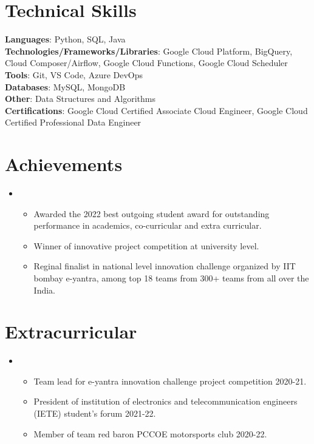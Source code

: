 \documentclass[letterpaper,11pt]{article}
\newcommand{\resumeItem}[1]{
  \item\small{
	{#1 \vspace{-2pt}}
  }
}
\newcommand{\resumeItemListStart}{\begin{itemize}}
\newcommand{\resumeItemListEnd}{\end{itemize}\vspace{-5pt}}
\begin{document}
\section{Technical Skills}
 \begin{itemize}[leftmargin=0.15in, label={}]
	\small{\item{
 	\textbf{Languages}{: Python, SQL, Java } \\
 	\textbf{Technologies/Frameworks/Libraries}{: Google Cloud Platform, BigQuery, Cloud Composer/Airflow, Google Cloud Functions, Google Cloud Scheduler } \\
 	\textbf{Tools}{: Git, VS Code, Azure DevOps } \\
 	\textbf{Databases}{: MySQL, MongoDB } \\
 	\textbf{Other}{: Data Structures and Algorithms } \\
  \textbf{Certifications}{: Google Cloud Certified Associate Cloud Engineer, Google Cloud Certified Professional Data Engineer} \\
	}}
 \end{itemize}
 \vspace{-16pt}


%
\section{Achievements}
\vspace{2pt}
 \begin{itemize}[leftmargin=0.15in, label={}]
 \item
	\resumeItemListStart
    	\resumeItem{Awarded the 2022 best outgoing student award for outstanding performance in academics, co-curricular and extra curricular.}
    	\resumeItem{Winner of innovative project competition at university level. }
    	\resumeItem{Reginal finalist in national level innovation challenge organized by IIT bombay e-yantra, among top 18 teams from 300+ teams from all over the India. }
  	\resumeItemListEnd
 \end{itemize}
 \vspace{-16pt}


%
\section{Extracurricular}
\vspace{2pt}
 \begin{itemize}[leftmargin=0.15in, label={}]
 \item
	\resumeItemListStart
    	\resumeItem {Team lead for e-yantra innovation challenge project competition 2020-21.}
    	\resumeItem {President of institution of electronics and telecommunication engineers (IETE) student's forum 2021-22.}
    	\resumeItem {Member of team red baron PCCOE motorsports club 2020-22.}
  	\resumeItemListEnd
 \end{itemize}
 \vspace{-16pt}
\end{document}

